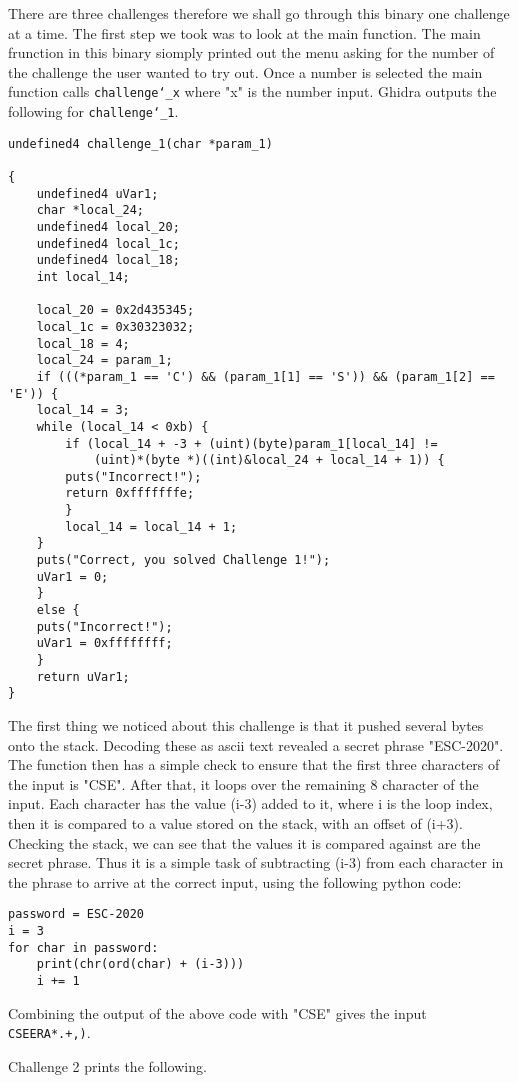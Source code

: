 There are three challenges therefore we shall go through this binary one challenge at a time. The first step we took was to look at the main function. The main frunction in this binary siomply printed out the menu asking for the number of the challenge the user wanted to try out. Once a number is selected the main function calls \texttt{challenge\char`_x} where "x" is the number input. Ghidra outputs the following for \texttt{challenge\char`_1}.

\begin{lstlisting}
undefined4 challenge_1(char *param_1)

{
	undefined4 uVar1;
	char *local_24;
	undefined4 local_20;
	undefined4 local_1c;
	undefined4 local_18;
	int local_14;
	
	local_20 = 0x2d435345;
	local_1c = 0x30323032;
	local_18 = 4;
	local_24 = param_1;
	if (((*param_1 == 'C') && (param_1[1] == 'S')) && (param_1[2] == 'E')) {
	local_14 = 3;
	while (local_14 < 0xb) {
		if (local_14 + -3 + (uint)(byte)param_1[local_14] !=
			(uint)*(byte *)((int)&local_24 + local_14 + 1)) {
		puts("Incorrect!");
		return 0xfffffffe;
		}
		local_14 = local_14 + 1;
	}
	puts("Correct, you solved Challenge 1!");
	uVar1 = 0;
	}
	else {
	puts("Incorrect!");
	uVar1 = 0xffffffff;
	}
	return uVar1;
}
\end{lstlisting}

The first thing we noticed about this challenge is that it pushed several bytes onto the stack. Decoding these as ascii text revealed a secret phrase "ESC-2020". The function then has a simple check to ensure that the first three characters of the input is "CSE". After that, it loops over the remaining 8 character of the input. Each character has the value (i-3) added to it, where i is the loop index, then it is compared to a value stored on the stack, with an offset of (i+3). Checking the stack, we can see that the values it is compared against are the secret phrase. Thus it is a simple task of subtracting (i-3) from each character in the phrase to arrive at the correct input, using the following python code:

\begin{lstlisting}
password = ESC-2020
i = 3
for char in password:
	print(chr(ord(char) + (i-3)))
	i += 1
\end{lstlisting}

Combining the output of the above code with "CSE" gives the input \texttt{CSEERA*.+,)}.

Challenge 2 prints the following.

